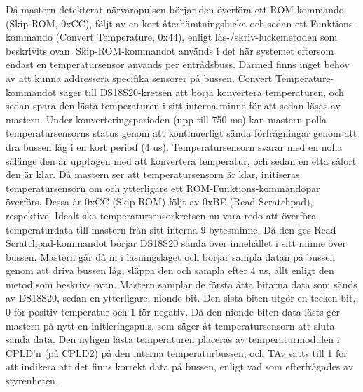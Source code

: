 \documentclass[a4paper,11pt]{article}
\begin{document}
Då mastern detekterat närvaropulsen börjar den överföra ett ROM-kommando (Skip ROM, 0xCC), följt av en kort återhämtningslucka
och sedan ett Funktions-kommando (Convert Temperature, 0x44), enligt läs-/skriv-luckemetoden som beskrivits ovan.
Skip-ROM-kommandot används i det här systemet eftersom endast en temperatursensor används per entrådsbuss.
Därmed finns inget behov av att kunna addressera specifika sensorer på bussen.
Convert Temperature-kommandot säger till DS18S20-kretsen att börja konvertera temperaturen, och sedan spara den 
lästa temperaturen i sitt interna minne för att sedan läsas av mastern.
Under konverteringsperioden (upp till 750 ms) kan mastern polla temperatursensorns status genom att kontinuerligt
sända förfrågningar genom att dra bussen låg i en kort period (4 us). Temperatursensorn svarar med en nolla
sålänge den är upptagen med att konvertera temperatur, och sedan en etta såfort den är klar.
Då mastern ser att temperatursensorn är klar, initiseras temperatursensorn om och ytterligare ett ROM-Funktions-kommandopar
överförs. Dessa är 0xCC (Skip ROM) följt av 0xBE (Read Scratchpad), respektive.
Idealt ska temperatursensorkretsen nu vara redo att överföra temperaturdata till mastern från sitt interna 9-bytesminne.
Då den ges Read Scratchpad-kommandot börjar DS18S20 sända över innehållet i sitt minne över bussen.
Mastern går då in i läsningsläget och börjar sampla datan på bussen genom att driva bussen låg, släppa den och sampla efter 4 us,
allt enligt den metod som beskrivs ovan. Mastern samplar de första åtta bitarna data som sänds av DS18S20, sedan en ytterligare,
nionde bit. Den sista biten utgör en tecken-bit, 0 för positiv temperatur och 1 för negativ. Då den nionde biten data lästs
ger mastern på nytt en initieringspuls, som säger åt temperatursensorn att sluta sända data.
Den nyligen lästa temperaturen placeras av temperaturmodulen i CPLD'n (på CPLD2) på den interna temperaturbussen, och
TAv sätts till 1 för att indikera att det finns korrekt data på bussen, enligt vad som efterfrågades av styrenheten.\\
\end{document}
